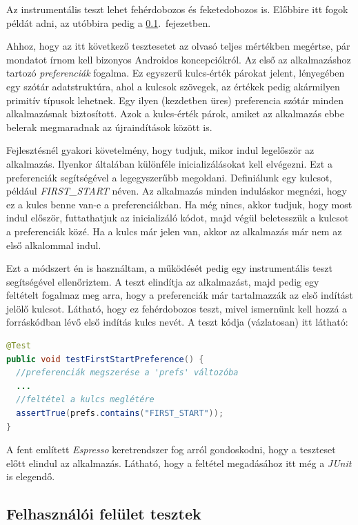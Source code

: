 \documentclass[12pt,a4paper]{article}
\begin{document}
	Az instrumentális teszt lehet fehérdobozos és feketedobozos is. Előbbire itt fogok példát adni, az utóbbira pedig a \ref{felhasznaloi_fel_teszt}.\ fejezetben.
	
	Ahhoz, hogy az itt következő tesztesetet az olvasó teljes mértékben megértse, pár mondatot írnom kell bizonyos Androidos koncepciókról. Az első az alkalmazáshoz tartozó \textit{preferenciák} fogalma. Ez egyszerű kulcs-érték párokat jelent, lényegében egy szótár adatstruktúra, ahol a kulcsok szövegek, az értékek pedig akármilyen primitív típusok lehetnek. Egy ilyen (kezdetben üres) preferencia szótár minden alkalmazásnak biztosított. Azok a kulcs-érték párok, amiket az alkalmazás ebbe belerak megmaradnak az újraindítások között is.
	
	Fejlesztésnél gyakori követelmény, hogy tudjuk, mikor indul legelőször az alkalmazás. Ilyenkor általában különféle inicializálásokat kell elvégezni. Ezt a preferenciák segítségével a legegyszerűbb megoldani. Definiálunk egy kulcsot, például \textit{FIRST\_START} néven. Az alkalmazás minden induláskor megnézi, hogy ez a kulcs benne van-e a preferenciákban.  Ha még nincs, akkor tudjuk, hogy most indul először, futtathatjuk az inicializáló kódot, majd végül beletesszük a kulcsot a preferenciák közé. Ha a kulcs már jelen van, akkor az alkalmazás már nem az első alkalommal indul.
	
	Ezt a módszert én is használtam, a működését pedig egy instrumentális teszt segítségével ellenőriztem. A teszt elindítja az alkalmazást, majd pedig egy feltételt fogalmaz meg arra, hogy a preferenciák már tartalmazzák az első indítást jelölő kulcsot. Látható, hogy ez fehérdobozos teszt, mivel ismernünk kell hozzá a forráskódban lévő első indítás kulcs nevét. A teszt kódja (vázlatosan) itt látható:
	
	\begin{lstlisting}[language=Java]
@Test
public void testFirstStartPreference() {
  //preferenciák megszerése a 'prefs' változóba
  ...
  //feltétel a kulcs meglétére
  assertTrue(prefs.contains("FIRST_START"));
}
	\end{lstlisting}
	
	A fent említett \textit{Espresso} keretrendszer fog arról gondoskodni, hogy a teszteset előtt elindul az alkalmazás. Látható, hogy a feltétel megadásához itt még a \textit{JUnit} is elegendő. 
	
	\subsection{Felhasználói felület tesztek}\label{felhasznaloi_fel_teszt}
	
\end{document}
